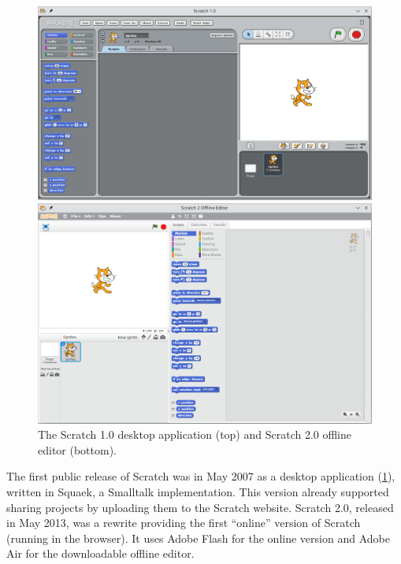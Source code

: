 \documentclass[../main]{subfiles}
\begin{document}
\begin{figure}
    \begin{wide}
        \includegraphics[width=\linewidth]{scratch-1}

        \vspace{1em}
        \includegraphics[width=\linewidth]{scratch-2}
    \end{wide}
    \caption{The Scratch 1.0 desktop application (top) and Scratch 2.0 offline editor (bottom).}
    \label{fig:scratch-1.0}
\end{figure}


The first public release of Scratch was in May 2007 as a desktop application (\cref{fig:scratch-1.0}), written in Squaek, a Smalltalk implementation.
This version already supported sharing projects by uploading them to the Scratch website.
Scratch 2.0, released in May 2013, was a rewrite providing the first ``online'' version of Scratch (running in the browser).
It uses Adobe Flash for the online version and Adobe Air for the downloadable offline editor.
\end{document}
